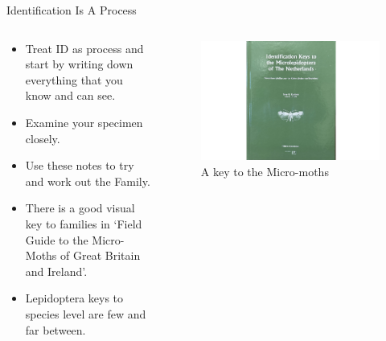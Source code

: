 \documentclass[
  ignorenonframetext,
]{beamer}
\providecommand{\tightlist}{%
  \setlength{\itemsep}{0pt}\setlength{\parskip}{0pt}}
\begin{document}
\begin{frame}{Identification Is A Process}
\protect\hypertarget{identification-is-a-process}{}
\begin{columns}[T]
\begin{column}{0.5\textwidth}
\begin{itemize}
\tightlist
\item
  Treat ID as process and start by writing down everything that you know
  and can see.
\item
  Examine your specimen closely.
\item
  Use these notes to try and work out the Family.
\item
  There is a good visual key to families in `Field Guide to the
  Micro-Moths of Great Britain and Ireland'.
\item
  Lepidoptera keys to species level are few and far between.
\end{itemize}
\end{column}

\begin{column}{0.5\textwidth}
\begin{figure}
\centering
\includegraphics{./images/micro-lep-key.jpg}
\caption{A key to the Micro-moths}
\end{figure}
\end{column}
\end{columns}
\end{frame}
\end{document}
